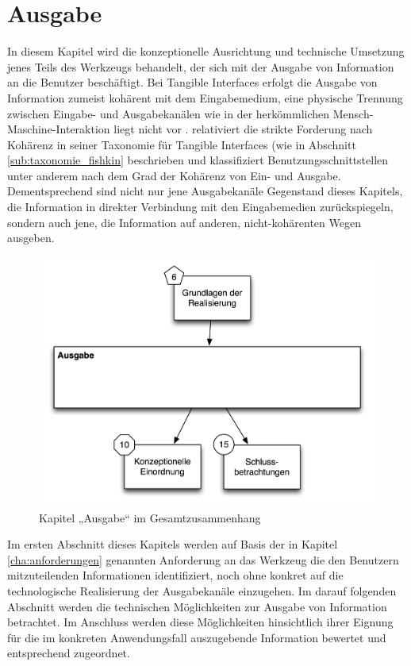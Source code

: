 
\chapter{Ausgabe} %
\label{cha:visualisierung}

In diesem Kapitel wird die konzeptionelle Ausrichtung und technische Umsetzung jenes Teils des Werkzeugs behandelt, der sich mit der Ausgabe von Information an die Benutzer beschäftigt. Bei Tangible Interfaces erfolgt die Ausgabe von Information zumeist kohärent mit dem Eingabemedium, eine physische Trennung zwischen Eingabe- und Ausgabekanälen wie in der herkömmlichen Mensch-Maschine-Interaktion liegt nicht vor \citep{Ullmer00}. \citet{Fishkin04} relativiert die strikte Forderung nach Kohärenz in seiner Taxonomie für Tangible Interfaces (wie in Abschnitt \ref{sub:taxonomie_fishkin} beschrieben und klassifiziert Benutzungsschnittstellen unter anderem nach dem Grad der Kohärenz von Ein- und Ausgabe. Dementsprechend sind nicht nur jene Ausgabekanäle Gegenstand dieses Kapitels, die Information in direkter Verbindung mit den Eingabemedien zurückspiegeln, sondern auch jene, die Information auf anderen, nicht-kohärenten Wegen ausgeben.

\begin{figure}[htbp]
	\centering
		\includegraphics[scale=0.75]{img/Kontextgrafiken/k8.png}
	\caption{Kapitel „Ausgabe“ im Gesamtzusammenhang}
	\label{fig:img_Kontextgrafiken_k8}
\end{figure}

Im ersten Abschnitt dieses Kapitels werden auf Basis der in Kapitel \ref{cha:anforderungen} genannten Anforderung an das Werkzeug die den Benutzern mitzuteilenden Informationen identifiziert, noch ohne konkret auf die technologische Realisierung der Ausgabekanäle einzugehen. Im darauf folgenden Abschnitt werden die technischen Möglichkeiten zur Ausgabe von Information betrachtet. Im Anschluss werden diese Möglichkeiten hinsichtlich ihrer Eignung für die im konkreten Anwendungsfall auszugebende Information bewertet und entsprechend zugeordnet.

